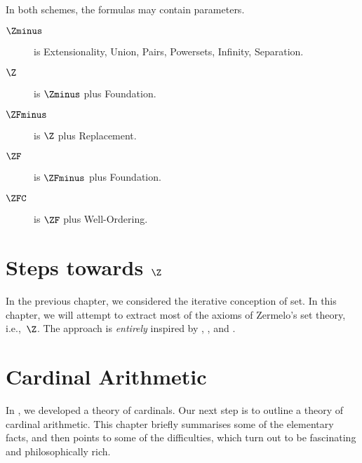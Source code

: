 In both schemes, the formulas may contain parameters. 

\begin{description}
\item[$\Zminus$] is Extensionality, Union, Pairs, Powersets, Infinity, Separation.
\item[$\Z$] is $\Zminus$ plus Foundation.
\item[$\ZFminus$] is $\Z$ plus Replacement.
\item[$\ZF$] is $\ZFminus$ plus Foundation.
\item[$\ZFC$] is $\ZF$ plus Well-Ordering.
\end{description}


\chapter{Steps towards $\Z$}

In the previous chapter, we considered the iterative conception of
set. In this chapter, we will attempt to extract most of the axioms of
Zermelo's set theory, i.e.,~$\Z$. The approach is \emph{entirely}
inspired by \citet{Boolos1971},  \citet{Scott1974}, and
\citet{Shoenfield:AST}. 

\olresetchapter






\chapter{Cardinal Arithmetic}

In , we developed a theory of cardinals.
Our next step is to outline a theory of cardinal arithmetic. This
chapter briefly summarises some of the elementary facts, and then
points to some of the difficulties, which turn out to be fascinating
and philosophically rich.

